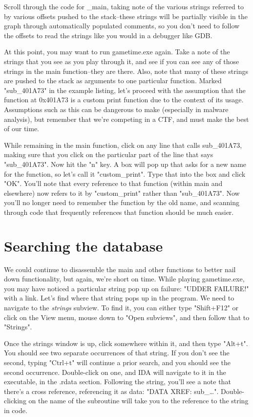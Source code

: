 \documentclass[11pt]{article}
\begin{document}
Scroll through the code for \_main, taking note of the various strings
referred to by various offsets pushed to the stack--these strings will be
partially visible in the graph through automatically populated comments, so
you don't need to follow the offsets to read the strings like you would in a
debugger like GDB.

At this point, you may want to run gametime.exe again. Take a note of the
strings that you see as you play through it, and see if you can see any of
those strings in the main function--they are there. Also, note that many of
these strings are pushed to the stack as arguments to one particular function.
Marked "sub\_401A73" in the example listing, let's proceed with the assumption
that the function at 0x401A73 is a custom print function due to the context of
its usage. Assumptions such as this can be dangerous to make (especially in
malware analysis), but remember that we're competing in a CTF, and must make
the best of our time.

While remaining in the main function, click on any line that calls sub\_401A73,
making sure that you click on the particular part of the line that says
"sub\_401A73". Now hit the "n" key. A box will pop up that asks for a new name
for the function, so let's call it "custom\_print". Type that into the box and
click "OK". You'll note that every reference to that function (within main and
elsewhere) now refers to it by "custom\_print" rather than "sub\_401A73". Now
you'll no longer need to remember the function by the old name, and scanning
through code that frequently references that function should be much easier.

\section{Searching the database}
\label{sec-5}
We could continue to disassemble the main and other functions to better nail
down functionality, but again, we're short on time. While playing
gametime.exe, you may have noticed a particular string pop up on failure:
"UDDER FAILURE!" with a link. Let's find where that string pops up in the
program. We need to navigate to the \emph{strings} subview. To find it, you can
either type "Shift+F12" or click on the View menu, mouse down to "Open
subviews", and then follow that to "Strings".

Once the strings window is up, click somewhere within it, and then type
"Alt+t". You should see two separate occurrences of that string. If you don't
see the second, typing "Ctrl+t" will continue a prior search, and you should
see the second occurrence. Double-click on one, and IDA will navigate to it in
the executable, in the .rdata section. Following the string, you'll see a note
that there's a cross reference, referencing it as data: "DATA XREF: sub\_\ldots{}".
Double-clicking on the name of the subroutine will take you to the reference
to the string in code.
\end{document}
